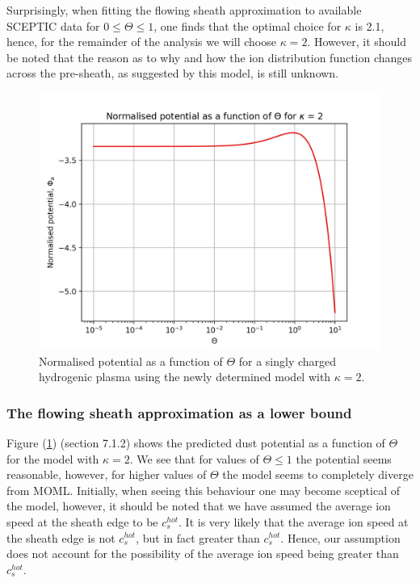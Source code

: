 \documentclass{article}
\begin{document}
\medskip 

Surprisingly, when fitting the flowing sheath approximation to available SCEPTIC data for $0 \leq \Theta \leq 1$, one finds that
the optimal choice for $\kappa$ is 2.1, hence, for the remainder of the analysis we will choose $\kappa = 2$. However, it should be noted that the reason as to why and how 
the ion distribution function changes across the pre-sheath, as suggested by this model, is still unknown.

\begin{figure}[H]
\centering
\includegraphics[width=\linewidth]{Output/FSpotential.jpeg}
\caption{Normalised potential as a function of $\Theta$ for a singly charged hydrogenic plasma
using the newly determined model with $\kappa = 2$.}
\label{FSpotential} 
\end{figure}

\subsubsection{The flowing sheath approximation as a lower bound}
\medskip

Figure (\ref{FSpotential}) (section 7.1.2) shows the predicted dust potential as a function of $\Theta$ for 
the model with $\kappa = 2$. We see that for values of $\Theta \leq 1$ the potential seems reasonable, however, for higher
values of $\Theta$ the model seems to completely diverge from MOML. Initially, when seeing this behaviour 
one may become sceptical of the model, however, it should be noted that we have assumed the average ion speed at
the sheath edge to be $c_s^{hot}$. It is very likely that the average ion
speed at the sheath edge is not $c_s^{hot}$, but in fact greater than $c_s^{hot}$. Hence, our assumption does not account for the possibility of the average ion 
speed being greater than $c_s^{hot}$. 
\end{document}
